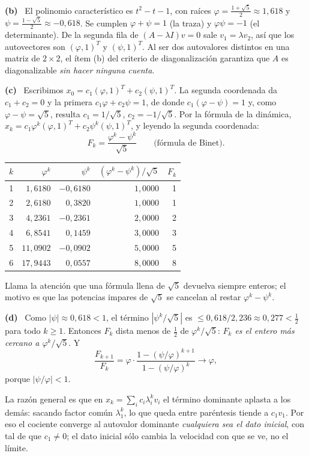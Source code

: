 \documentclass[11pt,a4paper]{article}
\newcommand{\bi}[1]{\boldsymbol{#1}}
\newcommand{\n}[1]{\boldsymbol{#1}}
\DeclareMathOperator{\gen}{span}
\DeclareMathOperator{\tr}{tr}
\DeclareMathOperator{\rg}{rg}
\def\n#1{#1}\def\bi#1{#1}\def\rg{rg}\def\tr{tr}\def\gen{span}%
\newcommand{\itemsol}[1]{\par\medskip\noindent\textbf{(#1)}\ \ignorespaces}
\begin{document}
\itemsol{b} El polinomio característico es $t^2-t-1$, con raíces
$\varphi=\frac{1+\sqrt5}{2}\approx1{,}618$ y
$\psi=\frac{1-\sqrt5}{2}\approx-0{,}618$. Se cumplen $\varphi+\psi=1$ (la traza)
y $\varphi\psi=-1$ (el determinante). De la segunda fila de
$(A-\lambda I)\n v=\n0$ sale $v_1=\lambda v_2$, así que los autovectores son
$(\varphi,1)^T$ y $(\psi,1)^T$. Al ser dos autovalores distintos en una matriz de
$2\times2$, el ítem (b) del criterio de diagonalización garantiza que $A$ es
diagonalizable \emph{sin hacer ninguna cuenta}.

\itemsol{c} Escribimos $\n x_0=c_1(\varphi,1)^T+c_2(\psi,1)^T$. La segunda
coordenada da $c_1+c_2=0$ y la primera $c_1\varphi+c_2\psi=1$, de donde
$c_1(\varphi-\psi)=1$ y, como $\varphi-\psi=\sqrt5$, resulta
$c_1=1/\sqrt5$, $c_2=-1/\sqrt5$. Por la fórmula de la dinámica,
$\n x_k=c_1\varphi^k(\varphi,1)^T+c_2\psi^k(\psi,1)^T$, y leyendo la segunda
coordenada:
\[
F_k=\frac{\varphi^{k}-\psi^{k}}{\sqrt5}\qquad\text{(fórmula de Binet).}
\]
\begin{center}
\begin{tabular}{@{}rrrrr@{}}
\hline
$k$ & $\varphi^k$ & $\psi^k$ & $(\varphi^k-\psi^k)/\sqrt5$ & $F_k$\\
\hline
1 & $1{,}6180$ & $-0{,}6180$ & $1{,}0000$ & 1\\
2 & $2{,}6180$ & $0{,}3820$ & $1{,}0000$ & 1\\
3 & $4{,}2361$ & $-0{,}2361$ & $2{,}0000$ & 2\\
4 & $6{,}8541$ & $0{,}1459$ & $3{,}0000$ & 3\\
5 & $11{,}0902$ & $-0{,}0902$ & $5{,}0000$ & 5\\
6 & $17{,}9443$ & $0{,}0557$ & $8{,}0000$ & 8\\
\hline
\end{tabular}
\end{center}
Llama la atención que una fórmula llena de $\sqrt5$ devuelva siempre enteros; el
motivo es que las potencias impares de $\sqrt5$ se cancelan al restar
$\varphi^k-\psi^k$.

\itemsol{d} Como $|\psi|\approx0{,}618<1$, el término $|\psi^k/\sqrt5|$ es
$\le0{,}618/2{,}236\approx0{,}277<\tfrac12$ para todo $k\ge1$. Entonces $F_k$
dista menos de $\tfrac12$ de $\varphi^k/\sqrt5$: \emph{$F_k$ es el entero más
cercano a $\varphi^k/\sqrt5$}. Y
\[
\frac{F_{k+1}}{F_k}
=\varphi\cdot\frac{1-(\psi/\varphi)^{k+1}}{1-(\psi/\varphi)^{k}}
\longrightarrow\varphi ,
\]
porque $|\psi/\varphi|<1$.

La razón general es que en $\n x_k=\sum_ic_i\lambda_i^k\n v_i$ el término
dominante aplasta a los demás: sacando factor común $\lambda_1^k$, lo que queda
entre paréntesis tiende a $c_1\n v_1$. Por eso el cociente converge al autovalor
dominante \emph{cualquiera sea el dato inicial}, con tal de que $c_1\neq0$; el
dato inicial sólo cambia la velocidad con que se ve, no el límite.
\end{document}
